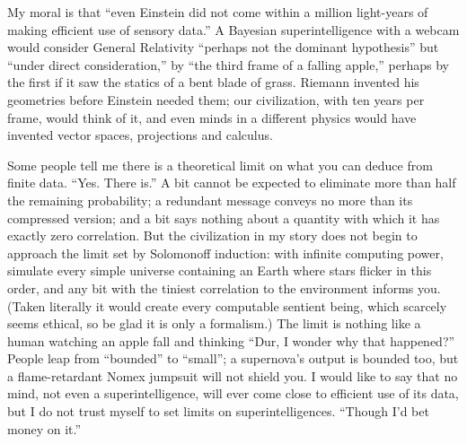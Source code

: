 My moral is that ``even Einstein did not come within a million light-years of making efficient use of sensory data.'' A Bayesian superintelligence with a webcam would consider General Relativity ``perhaps not the dominant hypothesis'' but ``under direct consideration,'' by ``the third frame of a falling apple,'' perhaps by the first if it saw the statics of a bent blade of grass. Riemann invented his geometries before Einstein needed them; our civilization, with ten years per frame, would think of it, and even minds in a different physics would have invented vector spaces, projections and calculus. 

Some people tell me there is a theoretical limit on what you can deduce from finite data. ``Yes. There is.'' A bit cannot be expected to eliminate more than half the remaining probability; a redundant message conveys no more than its compressed version; and a bit says nothing about a quantity with which it has exactly zero correlation.  But the civilization in my story does not begin to approach the limit set by Solomonoff induction: with infinite computing power, simulate every simple universe containing an Earth where stars flicker in this order, and any bit with the tiniest correlation to the environment informs you. (Taken literally it would create every computable sentient being, which scarcely seems ethical, so be glad it is only a formalism.) The limit is nothing like a human watching an apple fall and thinking ``Dur, I wonder why that happened?'' People leap from ``bounded'' to ``small''; a supernova's output is bounded too, but a flame-retardant Nomex jumpsuit will not shield you. I would like to say that no mind, not even a superintelligence, will ever come close to efficient use of its data, but I do not trust myself to set limits on superintelligences. ``Though I'd bet money on it.'' 

